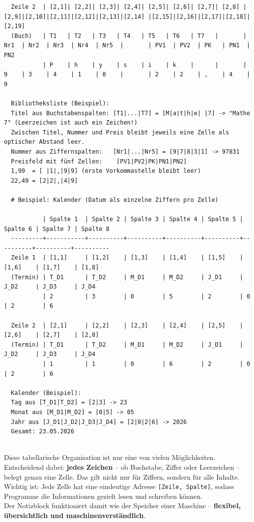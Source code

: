 \documentclass{article}
\begin{document}
\begin{verbatim}
  Zeile 2  | [2,1]| [2,2]| [2,3]| [2,4]| [2,5]| [2,6]| [2,7]| [2,8] | [2,9]|[2,10]|[2,11]|[2,12]|[2,13]|[2,14] |[2,15]|[2,16]|[2,17]|[2,18]|[2,19]
  (Buch)   | T1   | T2   | T3   | T4   | T5   | T6   | T7   |       | Nr1  | Nr2  | Nr3  | Nr4  | Nr5  |       | PV1  | PV2  | PK   | PN1  | PN2
           | P    | h    | y    | s    | i    | k    |      |       | 9    | 3    | 4    | 1    | 0    |       | 2    | 2    | ,    | 4    | 9

  Bibliotheksliste (Beispiel):
  Titel aus Buchstabenspalten: [T1|...|T7] = [M|a|t|h|e| |7] -> "Mathe 7" (Leerzeichen ist auch ein Zeichen!)
  Zwischen Titel, Nummer und Preis bleibt jeweils eine Zelle als optischer Abstand leer.
  Nummer aus Ziffernspalten:   [Nr1|...|Nr5] = [9|7|8|3|1] -> 97831
  Preisfeld mit fünf Zellen:    [PV1|PV2|PK|PN1|PN2]
  1,99  = [ |1|,|9|9] (erste Vorkommastelle bleibt leer)
  22,49 = [2|2|,|4|9]

  # Beispiel: Kalender (Datum als einzelne Ziffern pro Zelle)

           | Spalte 1  | Spalte 2 | Spalte 3 | Spalte 4 | Spalte 5 | Spalte 6 | Spalte 7 | Spalte 8
  ---------+-----------+----------+----------+----------+----------+----------+----------+----------
  Zeile 1  | [1,1]     | [1,2]    | [1,3]    | [1,4]    | [1,5]    | [1,6]    | [1,7]    | [1,8]
  (Termin) | T_D1      | T_D2     | M_D1     | M_D2     | J_D1     | J_D2     | J_D3     | J_D4
           | 2         | 3        | 0        | 5        | 2        | 0        | 2        | 6
  
  Zeile 2  | [2,1]     | [2,2]    | [2,3]    | [2,4]    | [2,5]    | [2,6]    | [2,7]    | [2,8]
  (Termin) | T_D1      | T_D2     | M_D1     | M_D2     | J_D1     | J_D2     | J_D3     | J_D4
           | 1         | 1        | 0        | 6        | 2        | 0        | 2        | 6

  Kalender (Beispiel):
  Tag aus [T_D1|T_D2] = [2|3] -> 23
  Monat aus [M_D1|M_D2] = [0|5] -> 05
  Jahr aus [J_D1|J_D2|J_D3|J_D4] = [2|0|2|6] -> 2026
  Gesamt: 23.05.2026
        
\end{verbatim}

        
Diese tabellarische Organisation ist nur eine von vielen Möglichkeiten. Entscheidend dabei: \textbf{jedes Zeichen} – ob Buchstabe, Ziffer oder Leerzeichen – belegt genau eine Zelle. Das gilt nicht nur für Ziffern, sondern für alle Inhalte.\\[0.3em]
          Wichtig ist: Jede Zelle hat eine eindeutige Adresse \texttt{[Zeile, Spalte]}, sodass Programme die Informationen gezielt lesen und schreiben können.\\
          Der Notizblock funktioniert damit wie der Speicher einer Maschine – \textbf{flexibel, übersichtlich und maschinenverständlich}.
\end{document}
